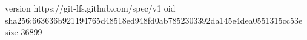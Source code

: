 version https://git-lfs.github.com/spec/v1
oid sha256:663636b921194765d48518ed948fd0ab7852303392da145e4dea0551315cc53e
size 36899
